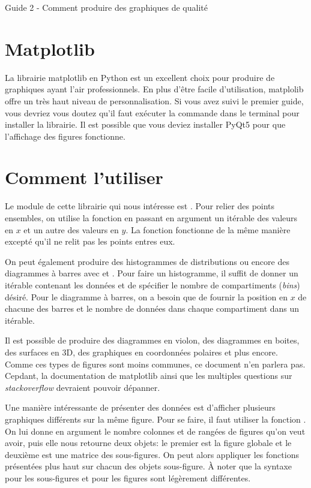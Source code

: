 \documentclass{article}
\begin{document}
\begin{center}
\Huge Guide 2 - Comment produire des graphiques de qualité
\end{center}

\section{Matplotlib}
La librairie matplotlib en Python est un excellent choix pour produire de graphiques ayant l'air professionnels. En plus d'être facile d'utilisation, matplolib offre un très haut niveau de personnalisation. Si vous avez suivi le premier guide, vous devriez vous doutez qu'il faut exécuter la commande  dans le terminal pour installer la librairie. Il est possible que vous deviez installer PyQt5 pour que l'affichage des figures fonctionne.

\section{Comment l'utiliser}
Le module de cette librairie qui nous intéresse est . Pour relier des points ensembles, on utilise la fonction  en passant en argument un itérable des valeurs en $x$ et un autre des valeurs en $y$. La fonction  fonctionne de la même manière excepté qu'il ne relit pas les points entres eux. 

On peut également produire des histogrammes de distributions ou encore des diagrammes à barres avec  et . Pour faire un histogramme, il suffit de donner un itérable contenant les données et de spécifier le nombre de compartiments (\textit{bins}) désiré. Pour le diagramme 
à barres, on a besoin que de fournir la position en $x$ de chacune des barres et le nombre de données dans chaque compartiment dans un itérable.

Il est possible de produire des diagrammes en violon, des diagrammes en boites, des surfaces en 3D, des graphiques en coordonnées polaires et plus encore. Comme ces types de figures sont moins communes, ce document n'en parlera pas. Cepdant, la documentation de matplotlib ainsi que les multiples questions sur \textit{stackoverflow} devraient pouvoir dépanner.

Une manière intéressante de présenter des données est d'afficher plusieurs graphiques différents sur la même figure. Pour se faire, il faut utiliser la fonction . On lui donne en argument le nombre colonnes et de rangées de figures qu'on veut avoir, puis elle nous retourne deux objets: le premier est la figure globale et le deuxième est une matrice des sous-figures. On peut alors appliquer les fonctions présentées plus haut sur chacun des objets sous-figure. À noter que la syntaxe pour les sous-figures et pour les figures sont légèrement différentes.
\end{document}

